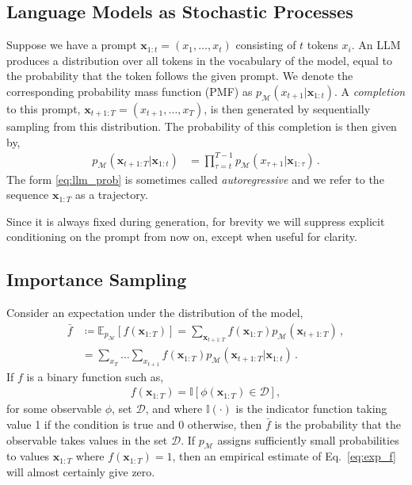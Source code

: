 \documentclass{article}
\newcommand{\realtraj}{\mathbf{x}}
\newcommand{\realtoken}{x}
\newcommand{\obs}{\phi}
\newcommand{\UnwantedSet}{\mathcal{D}}
\newcommand{\EV}{\mathbb{E}}
\newcommand{\pdfmodel}{p_{\mathcal{M}}}
\newcommand{\Indf}{\mathbb I}
\begin{document}
\subsection{Language Models as Stochastic Processes}
Suppose we have a prompt $\realtraj_{1:t} = (x_1, \dots, x_t)$ consisting of $t$ tokens $x_i$. An LLM produces a distribution over all tokens in the vocabulary of the model, equal to the probability that the token follows the given prompt.
We denote the corresponding probability mass function (PMF) as $\pdfmodel(\realtoken_{t+1} | \realtraj_{1:t})$. A \textit{completion} to this prompt, $\realtraj_{t+1:T} = (x_{t+1}, \dots, x_T)$, is then generated by sequentially sampling from this distribution.
The probability of this completion is then given by,
\begin{align}
    \pdfmodel(\realtraj_{t+1 : T} | \realtraj_{1:t})
     & =
    \prod_{\tau=t}^{T-1} \pdfmodel(\realtoken_{\tau + 1} | \realtraj_{1 : \tau}) \,.
    \label{eq:llm_prob}
\end{align}
The form \eqref{eq:llm_prob} is sometimes called {\em autoregressive} and we refer to the sequence $\realtraj_{1:T}$ as a trajectory.

Since it is always fixed during generation, for brevity we will suppress explicit conditioning on the prompt from now on, except when useful for clarity.

\subsection{Importance Sampling}
Consider an expectation under the distribution of the model,
\begin{align}
    \bar{f}
     & \coloneqq
    \EV_{\pdfmodel}\left[ f(\realtraj_{1:T}) \right]
    =
    \sum_{\realtraj_{t+1 : T}} f(\realtraj_{1:T}) \pdfmodel(\realtraj_{t+1 : T})
    \,, \nonumber \\
     & =
    \sum_{\realtoken_{T}} \dots \sum_{\realtoken_{t+1}}  f(\realtraj_{1:T}) \pdfmodel(\realtraj_{t+1:T} | \realtraj_{1:t})
    \,.
    \label{eq:exp_f}
\end{align}
If $f$ is a binary function such as,
\begin{align}
    f(\realtraj_{1:T}) = \Indf[\obs(\realtraj_{1:T}) \in \UnwantedSet],
\end{align}
for some observable $\obs$, set $\UnwantedSet$, and where $\Indf(\cdot)$ is the indicator function taking value 1 if the condition is true and 0 otherwise, then $\bar{f}$ is the probability that the observable takes values in the set $\UnwantedSet$. If $\pdfmodel$ assigns sufficiently small probabilities to values $\realtraj_{1:T}$ where $f(\realtraj_{1:T}) = 1$, then an empirical estimate of Eq.~\eqref{eq:exp_f} will almost certainly give zero.
\end{document}

